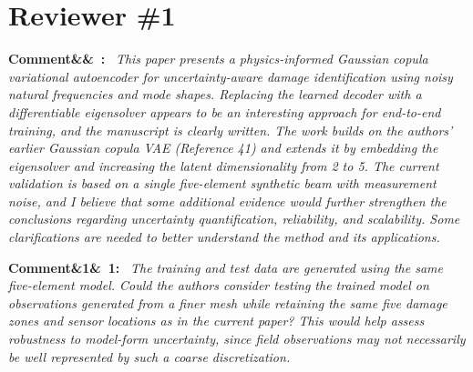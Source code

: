 \documentclass[11pt]{article}
\newenvironment{rcomment}[1]{\par\bigskip\noindent\textbf{Comment\ifx&#1&\else\ #1\fi:}\ \itshape}{\par}
\begin{document}
\section{Reviewer \#1}

\begin{rcomment}{}
This paper presents a physics-informed Gaussian copula variational autoencoder for uncertainty-aware damage
identification using noisy natural frequencies and mode shapes. Replacing the learned decoder with a differentiable
eigensolver appears to be an interesting approach for end-to-end training, and the manuscript is clearly written. The work
builds on the authors' earlier Gaussian copula VAE (Reference 41) and extends it by embedding the eigensolver and
increasing the latent dimensionality from 2 to 5. The current validation is based on a single five-element synthetic
beam with measurement noise, and I believe that some additional evidence would further strengthen the conclusions
regarding uncertainty quantification, reliability, and scalability. Some clarifications are needed to better understand
the method and its applications.
\end{rcomment}

\begin{rcomment}{1}
The training and test data are generated using the same five-element model. Could the authors consider testing the trained model on observations generated from a finer mesh while retaining the same five damage zones and sensor locations as in the current paper? This would help assess robustness to model-form uncertainty, since field observations
may not necessarily be well represented by such a coarse discretization.
\end{rcomment}
\end{document}
